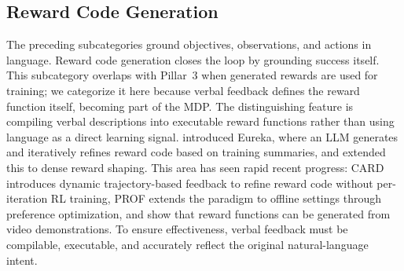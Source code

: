 \subsection{Reward Code Generation}%
\label{sec:reward-code}
The preceding subcategories ground objectives, observations, and actions in language. Reward code generation closes the loop by grounding success itself. This subcategory overlaps with Pillar~3 when generated rewards are used for training; we categorize it here because verbal feedback defines the reward function itself, becoming part of the MDP. The distinguishing feature is compiling verbal descriptions into executable reward functions rather than using language as a direct learning signal. \citet{ma2024eureka} introduced Eureka, where an LLM generates and iteratively refines reward code based on training summaries, and \citet{xie2024text2reward} extended this to dense reward shaping. This area has seen rapid recent progress: CARD \citep{sun2025large} introduces dynamic trajectory-based feedback to refine reward code without per-iteration RL training, PROF \citep{sun2025prof} extends the paradigm to offline settings through preference optimization, and \citet{zeng2024video2reward} show that reward functions can be generated from video demonstrations. To ensure effectiveness, verbal feedback must be compilable, executable, and accurately reflect the original natural-language intent.
